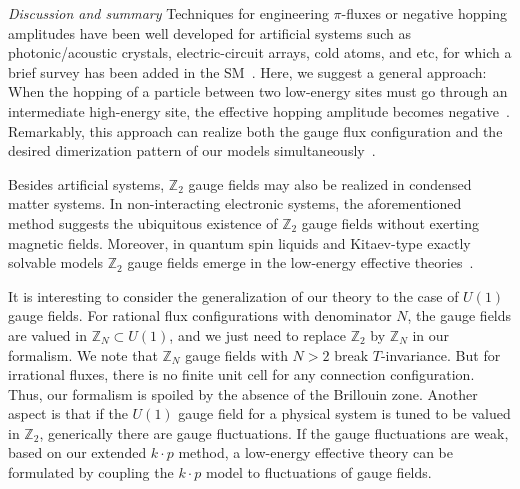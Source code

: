 \documentclass[aps,prl,twocolumn,noshowpacs,superscriptaddress]{revtex4-1}
\def \Z {\mathbb{Z}}
\begin{document}
{\color{blue}\textit{Discussion and summary}}
Techniques for engineering $\pi$-fluxes or negative hopping amplitudes have been well developed for artificial systems such as photonic/acoustic crystals, electric-circuit arrays, cold atoms, and etc, for which a brief survey has been added in the SM~\cite{SM}.
Here, we suggest a general approach: When the hopping of a particle between two low-energy sites must go through an intermediate high-energy site, the effective hopping amplitude becomes negative~\cite{Keil2016,SM}. 
Remarkably, this approach can realize both the gauge flux configuration and the desired dimerization pattern of our models simultaneously~\cite{SM}. 

Besides artificial systems, $\Z_2$ gauge fields may also be realized in condensed matter systems. In non-interacting electronic systems, the aforementioned method suggests the ubiquitous existence of $\Z_2$ gauge fields without exerting magnetic fields. Moreover, in quantum spin liquids and Kitaev-type exactly solvable models $\Z_2$ gauge fields emerge in the low-energy effective theories~\cite{Wen-PSG,Kitaev2006}.

It is interesting to consider the generalization of our theory to the case of $U(1)$ gauge fields. For rational flux configurations with denominator $N$, the gauge fields are valued in $\Z_N\subset U(1)$, and we just need to replace $\Z_2$ by $\Z_N$ in our formalism. We note that $\Z_N$ gauge fields with $N>2$ break $T$-invariance. But for irrational fluxes, there is no finite unit cell for any connection configuration. Thus, our formalism is spoiled by the absence of the Brillouin zone. Another aspect is that if the $U(1)$ gauge field for a physical system is tuned to be valued in $\Z_2$, generically there are gauge fluctuations. If the gauge fluctuations are weak, based on our extended $k\cdot p$ method, a low-energy effective theory can be formulated by coupling the $k\cdot p$ model to fluctuations of gauge fields.
\end{document}
